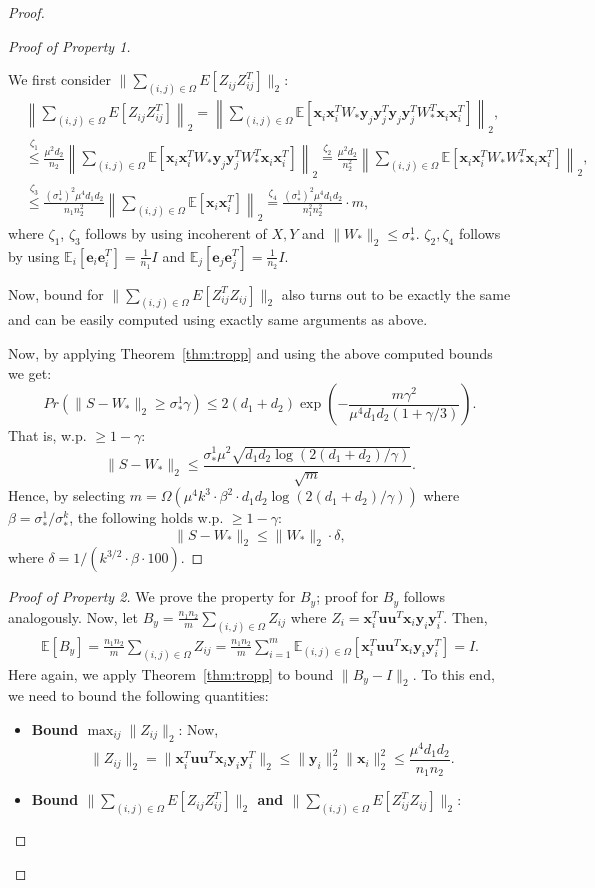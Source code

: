 \documentclass[11pt]{article}
\newcommand{\e}{\bm{e}}
\newcommand{\tp}[1]{{#1}^{T}}
\newcommand{\E}{\mathbb{E}}
\renewcommand{\u}{\bm{u}}
\newcommand{\so}{\sigma_*}
\newcommand{\xti}{\tp{\x}_i}
\newcommand{\yti}{\tp{\y}_i}
\newcommand{\ytj}{\tp{\y}_j}
\newcommand{\Wo}{W_*}
\newcommand{\x}{\bm{x}}
\newcommand{\y}{\bm{y}}
\newcommand{\xit}{\tp{\x}_i}
\newcommand{\eit}{\tp{\e}_i}
\newcommand{\ejt}{\tp{\e}_j}
\newcommand{\yi}{\y_i}
\newcommand{\yj}{\y_j}
\begin{document}
\begin{proof}
\begin{proof}[Proof of Property 1]
\begin{itemize}
We first consider $\|\sum_{(i,j)\in \Omega}E[Z_{ij}Z_{ij}^T]\|_2$:
\begin{align}
&\left\|\sum_{(i,j)\in \Omega}E[Z_{ij}Z_{ij}^T]\right\|_2=\left\|\sum_{(i,j)\in \Omega}\E[\x_i\xti\Wo\yj\ytj\yj\ytj\Wo^T \x_i \xti]\right\|_2,\nonumber\\
&\stackrel{\zeta_1}{\leq} \frac{\mu^2 d_2}{n_2}\left\|\sum_{(i,j)\in \Omega}\E[\x_i\xti\Wo\yj\ytj\Wo^T \x_i \xti]\right\|_2\stackrel{\zeta_2}{=}\frac{\mu^2 d_2}{n_2^2}\left\|\sum_{(i,j)\in \Omega}\E[\x_i\xti\Wo\Wo^T \x_i \xti]\right\|_2,\nonumber\\
&\stackrel{\zeta_3}{\leq }\frac{(\so^1)^2\mu^4 d_1d_2}{n_1n_2^2}\left\|\sum_{(i,j)\in \Omega}\E[\x_i\xti]\right\|_2\stackrel{\zeta_4}{= }\frac{(\so^1)^2\mu^4 d_1d_2}{n_1^2n_2^2}\cdot m,\label{eq:imc_var}
\end{align}
where $\zeta_1$, $\zeta_3$ follows by using incoherent of $X, Y$ and $\|\Wo\|_2\leq \so^1$. $\zeta_2, \zeta_4$ follows by using $\E_{i}[\e_i\eit]=\frac{1}{n_1}I$ and $\E_{j}[\e_j\ejt]=\frac{1}{n_2}I$. 

Now, bound for $\|\sum_{(i,j)\in \Omega}E[Z_{ij}^TZ_{ij}]\|_2$ also turns out to be exactly the same and can be easily computed using exactly same arguments as above. 
\end{itemize}
Now, by applying Theorem~\ref{thm:tropp} and using the above computed bounds we get: 
\begin{equation}
  \label{eq:imcprz}
  Pr(\|S-\Wo\|_2\geq \so^1\gamma)\leq 2(d_1+d_2)\exp\left(-\frac{m\gamma^2}{\mu^4 d_1d_2(1+\gamma/3)}\right). 
\end{equation}
That is, w.p. $\geq 1-\gamma$: 
\begin{equation}
  \label{eq:imcprz1}
  \|S-\Wo\|_2 \leq \frac{\so^1\mu^2\sqrt{d_1d_2\log(2(d_1+d_2)/\gamma)}}{\sqrt{m}}. 
\end{equation}
Hence, by selecting $m=\Omega(\mu^4k^3\cdot \beta^2\cdot d_1d_2\log(2(d_1+d_2)/\gamma))$ where $\beta=\so^1/\so^k$, the following holds w.p. $\geq 1-\gamma$: 
$$\|S-\Wo\|_2 \leq \|\Wo\|_2\cdot \delta, $$
where $\delta= 1/(k^{3/2}\cdot \beta\cdot 100)$. 
\end{proof}
\begin{proof}[Proof of Property 2]
We prove the property for $B_y$; proof for $B_y$ follows analogously. Now, let $B_y=\frac{n_1n_2}{m}\sum_{(i,j)\in \Omega} Z_{ij}$ where $Z_i=\xit\u\u^T\x_i\yi\yti$. Then, 
\begin{align}
  \E[B_y]=\frac{n_1n_2}{m}\sum_{(i,j)\in \Omega} Z_{ij}=\frac{n_1n_2}{m}\sum_{i=1}^m\E_{(i,j)\in \Omega}[\xit\u\u^T\x_i\yi\yti]=I. 
\end{align}
Here again, we apply Theorem~\ref{thm:tropp} to bound $\|B_y-I\|_2$. To this end, we need to bound the following quantities: 
\begin{itemize}
\item {\bf Bound $\max_{ij} \|Z_{ij}\|_2$}: Now, $$\|Z_{ij}\|_2=\|\xit\u\u^T\x_i\yi\yti\|_2\leq \|\yi\|_2^2\|\x_i\|_2^2\leq \frac{\mu^4 d_1d_2}{n_1n_2}.$$
\item {\bf Bound $\|\sum_{(i,j)\in \Omega}E[Z_{ij}Z_{ij}^T]\|_2$ and  $\|\sum_{(i,j)\in \Omega}E[Z_{ij}^TZ_{ij}]\|_2$}: 


\end{itemize}
\end{proof}
\end{proof}
\end{document}
